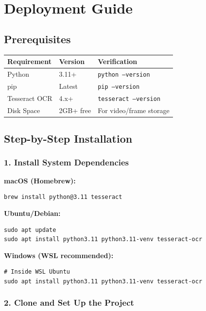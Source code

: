 \documentclass[12pt, a4paper]{article}
\newcommand{\codeinline}[1]{\texttt{\small\colorbox{codebg}{#1}}}
\begin{document}
\section{Deployment Guide}

\subsection{Prerequisites}

\begin{tabularx}{\textwidth}{@{} l l X @{}}
    \toprule
    \textbf{Requirement} & \textbf{Version} & \textbf{Verification} \\
    \midrule
    Python & 3.11+ & \codeinline{python --version} \\
    pip & Latest & \codeinline{pip --version} \\
    Tesseract OCR & 4.x+ & \codeinline{tesseract --version} \\
    Disk Space & 2GB+ free & For video/frame storage \\
    \bottomrule
\end{tabularx}

\subsection{Step-by-Step Installation}

\subsubsection{1. Install System Dependencies}

\textbf{macOS (Homebrew):}
\begin{lstlisting}[style=bash]
brew install python@3.11 tesseract
\end{lstlisting}

\textbf{Ubuntu/Debian:}
\begin{lstlisting}[style=bash]
sudo apt update
sudo apt install python3.11 python3.11-venv tesseract-ocr
\end{lstlisting}

\textbf{Windows (WSL recommended):}
\begin{lstlisting}[style=bash]
# Inside WSL Ubuntu
sudo apt install python3.11 python3.11-venv tesseract-ocr
\end{lstlisting}

\subsubsection{2. Clone and Set Up the Project}
\end{document}
